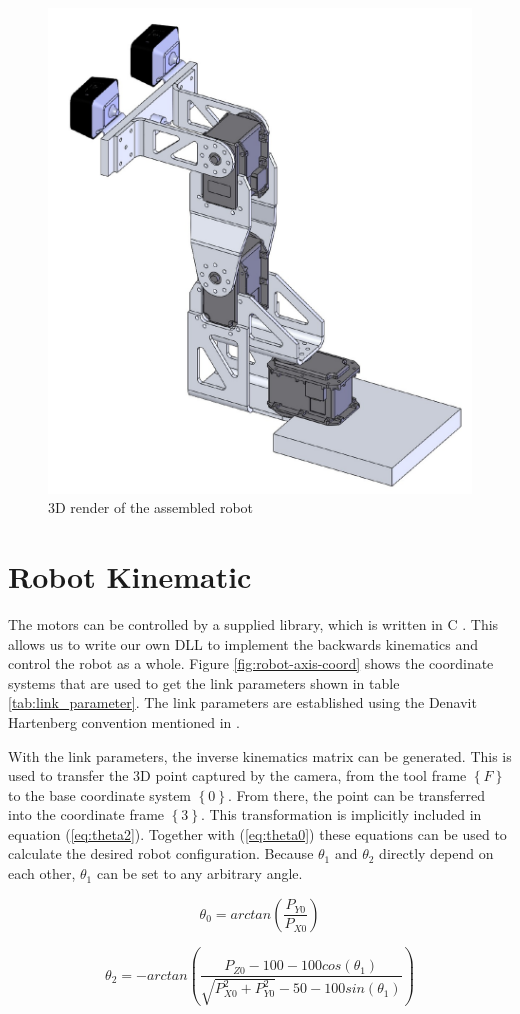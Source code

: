 \documentclass[11pt,twoside,twocolumn,a4paper]{article}
\begin{document}
\begin{figure}[h]
	\centering
	\includegraphics[width=0.3\columnwidth]{images/robot_3D_side.pdf}
	\caption{3D render of the assembled robot}
	\label{fig:3d-render}
\end{figure}



\section{Robot Kinematic}

The motors can be controlled by a supplied library, which is written in C \cite{Robotis2019}. This allows us to write our own DLL to implement the backwards kinematics and control the robot as a whole. Figure \ref{fig:robot-axis-coord} shows the coordinate systems that are used to get the link parameters shown in table \ref{tab:link_parameter}. The link parameters are established using the Denavit Hartenberg convention mentioned in \cite[p. 70-79]{Craig2018}.


With the link parameters, the inverse kinematics matrix can be generated. This is used to transfer the 3D point captured by the camera, from the tool frame $\left\lbrace F \right\rbrace$  to the base coordinate system $\left\lbrace 0 \right\rbrace $. From there, the point can be transferred into the coordinate frame $\left\lbrace 3 \right\rbrace $. This transformation is implicitly included in equation (\ref{eq:theta2}). Together with (\ref{eq:theta0}) these equations can be used to calculate the desired robot configuration. 
Because $\theta_1$ and $\theta_2$ directly depend on each other, $\theta_1$ can be set to any arbitrary angle.

\begin{equation}
\label{eq:theta0}
\theta_0 = arctan \left(  \frac{P_{Y0}}{P_{X0}} \right) 
\end{equation}

\begin{equation}
\label{eq:theta2}
\theta_2 = - arctan \left( \frac{ P_{Z0} - 100 - 100 cos(\theta_1)}{\sqrt{P_{X0}^{2} + P_{Y0}^{2}} - 50 - 100 sin(\theta_1)} \right)
\end{equation}
\end{document}
